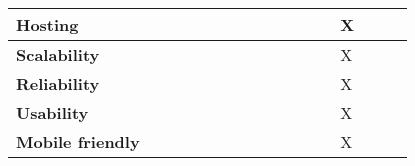\begin{longtable}{
>{\arraybackslash}p{0.35\linewidth}|
>{\centering\arraybackslash}p{0.15\linewidth}|
>{\centering\arraybackslash}p{0.15\linewidth}|
>{\centering\arraybackslash}p{0.15\linewidth}}
 \cline{1-4}

 \textbf{Hosting}&
 {}&
 {}&
 {X}\\

 \cline{1-4}
 
 \textbf{Scalability}&
 {}&
 {}&
 {X}\\

 \cline{1-4}
 
 \textbf{Reliability}&
 {}&
 {}&
 {X}\\

 \cline{1-4}
 
 \textbf{Usability}&
 {}&
 {}&
 {X}\\

 \cline{1-4}

 \textbf{Mobile friendly}&
 {}&
 {}&
 {X}\\


 \end{longtable}
